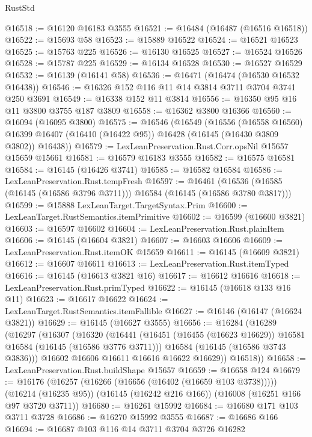 \begin{lexlean}{RustStd}
\begin{coremodule}
{\begin{coremodule}
{{{{{{{{{{{{{{{{{{{{{{{{{{{{{{{{{{{{{{{{{{{{{{{@16518 := @16120 @16183 @3555
@16521 := @16484 (@16487 (@16516 @16518))
@16522 := @15693 @58
@16523 := @15889 @16522
@16524 := @16521 @16523
@16525 := @15763 @225
@16526 := @16130 @16525
@16527 := @16524 @16526
@16528 := @15787 @225
@16529 := @16134 @16528
@16530 := @16527 @16529
@16532 := @16139 (@16141 @58)
@16536 := @16471 (@16474 (@16530 @16532 @16438))
@16546 := @16326 @152 @116 @11 @14 @3814 @3711 @3704 @3741 @250 @3691
@16549 := @16338 @152 @11 @3814
@16556 := @16350 @95 @16 @11 @3800 @3755 @187 @3809
@16558 := @16362 @3800 @16366
@16560 := @16094 (@16095 @3800)
@16575 := @16546
    (@16549
      (@16556
        (@16558 @16560)
        @16399
        @16407
        (@16410 (@16422 @95))
        @16428
        (@16145 (@16430 @3809 @3802))
        @16438))
@16579 := LexLeanPreservation.Rust.Corr.opsNil @15657 @15659 @15661
@16581 := @16579 @16183 @3555
@16582 := @16575 @16581
@16584 := @16145 (@16426 @3741)
@16585 := @16582 @16584
@16586 := LexLeanPreservation.Rust.tempFresh
@16597 := @16461
    (@16536 (@16585 (@16145 (@16586 @3796 @3711))) @16584 (@16145 (@16586 @3780 @3817)))
@16599 := @15888 LexLeanTarget.TargetSyntax.Prim
@16600 := LexLeanTarget.RustSemantics.itemPrimitive
@16602 := @16599 (@16600 @3821)
@16603 := @16597 @16602
@16604 := LexLeanPreservation.Rust.plainItem
@16606 := @16145 (@16604 @3821)
@16607 := @16603 @16606
@16609 := LexLeanPreservation.Rust.itemOK @15659
@16611 := @16145 (@16609 @3821)
@16612 := @16607 @16611
@16613 := LexLeanPreservation.Rust.itemTyped
@16616 := @16145 (@16613 @3821 @16)
@16617 := @16612 @16616
@16618 := LexLeanPreservation.Rust.primTyped
@16622 := @16145 (@16618 @133 @16 @11)
@16623 := @16617 @16622
@16624 := LexLeanTarget.RustSemantics.itemFallible
@16627 := @16146 (@16147 (@16624 @3821))
@16629 := @16145 (@16627 @3555)
@16656 := @16284
    (@16289
      (@16297
        (@16307
          (@16320
            (@16441
              (@16451 (@16455 (@16623 @16629)) @16581 @16584 (@16145 (@16586 @3776 @3711)))
              @16584
              (@16145 (@16586 @3743 @3836)))
            @16602
            @16606
            @16611
            @16616
            @16622
            @16629))
        @16518))
@16658 := LexLeanPreservation.Rust.buildShape @15657
@16659 := @16658 @124
@16679 := @16176
    (@16257 (@16266 (@16656 (@16402 (@16659 @103 @3738)))))
    (@16214 (@16235 @95))
    (@16145 (@16242 @216 @166))
    (@16008 (@16251 @166 @97 @3720 @3711))
@16680 := @16261 @15992
@16684 := @16680 @171 @103 @3711 @3728
@16686 := @16270 @15992 @3555
@16687 := @16686 @166
@16694 := @16687 @103 @116 @14 @3711 @3704 @3726 @16282
}}}}}}}}}}}}}}}}}}}}}}}}}}}}}}}}}}}}}}}}}}}}}}}
\end{coremodule}}
\end{coremodule}
\end{lexlean}
